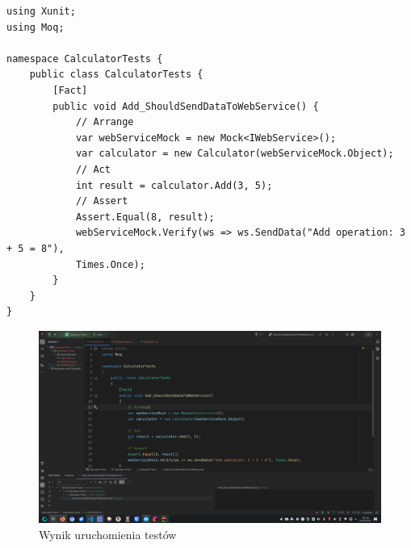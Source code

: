 \documentclass[12pt]{article}
\begin{document}
\begin{verbatim}
using Xunit;
using Moq;

namespace CalculatorTests {
    public class CalculatorTests {
        [Fact]
        public void Add_ShouldSendDataToWebService() {
            // Arrange
            var webServiceMock = new Mock<IWebService>();
            var calculator = new Calculator(webServiceMock.Object);
            // Act
            int result = calculator.Add(3, 5);
            // Assert
            Assert.Equal(8, result);
            webServiceMock.Verify(ws => ws.SendData("Add operation: 3 + 5 = 8"),
            Times.Once);
        }
    }
}
\end{verbatim}
\begin{figure}[H]
  \centering
  \includegraphics[width=1\textwidth,keepaspectratio]{image-26.png}
  \caption{Wynik uruchomienia testów}
  \label{fig:image-26}
\end{figure}

\pagebreak
\end{document}
